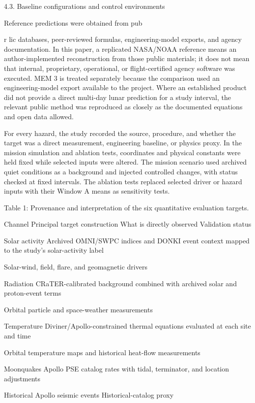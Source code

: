 4.3. Baseline configurations and control environments

Reference predictions were obtained from pub

r lic databases, peer-reviewed formulas, engineering-model exports, and agency documentation. In this paper, a replicated NASA/NOAA reference means an author-implemented reconstruction from those public materials; it does not mean that internal, proprietary, operational, or flight-certified agency software was executed. MEM 3 is treated separately because the comparison used an engineering-model export available to the project. Where an established product did not provide a direct multi-day lunar prediction for a study interval, the relevant public method was reproduced as closely as the documented equations and open data allowed.

For every hazard, the study recorded the source, procedure, and whether the target was a direct measurement, engineering baseline, or physics proxy. In the mission simulation and ablation tests, coordinates and physical constants were held fixed while selected inputs were altered. The mission scenario used archived quiet conditions as a background and injected controlled changes, with status checked at fixed intervals. The ablation tests replaced selected driver or hazard inputs with their Window A means as sensitivity tests.

Table 1: Provenance and interpretation of the six quantitative evaluation targets.

Channel Principal target construction What is directly observed Validation status

Solar activity Archived OMNI/SWPC indices and DONKI event context mapped to the study's solar-activity label

Solar-wind, field, flare, and geomagnetic drivers

Radiation CRaTER-calibrated background combined with archived solar and proton-event terms

Orbital particle and space-weather measurements

Temperature Diviner/Apollo-constrained thermal equations evaluated at each site and time

Orbital temperature maps and historical heat-flow measurements

Moonquakes Apollo PSE catalog rates with tidal, terminator, and location adjustments

Historical Apollo seismic events Historical-catalog proxy

